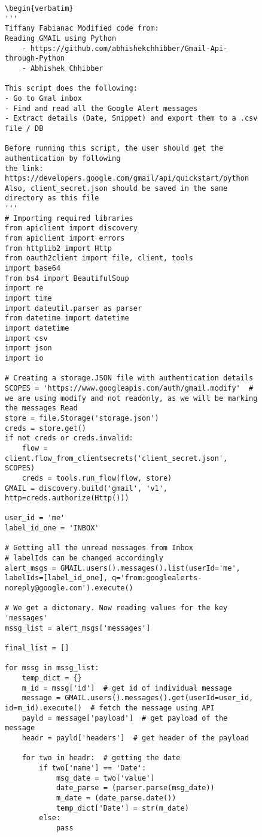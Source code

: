 \documentclass[sigconf]{acmart}
\begin{document}
\begin{figure}[htb]
\begin{lstlisting}
\begin{verbatim}
'''
Tiffany Fabianac Modified code from:
Reading GMAIL using Python
    - https://github.com/abhishekchhibber/Gmail-Api-through-Python
	- Abhishek Chhibber

This script does the following:
- Go to Gmal inbox
- Find and read all the Google Alert messages
- Extract details (Date, Snippet) and export them to a .csv file / DB

Before running this script, the user should get the authentication by following 
the link: https://developers.google.com/gmail/api/quickstart/python
Also, client_secret.json should be saved in the same directory as this file
'''
# Importing required libraries
from apiclient import discovery
from apiclient import errors
from httplib2 import Http
from oauth2client import file, client, tools
import base64
from bs4 import BeautifulSoup
import re
import time
import dateutil.parser as parser
from datetime import datetime
import datetime
import csv
import json
import io

# Creating a storage.JSON file with authentication details
SCOPES = 'https://www.googleapis.com/auth/gmail.modify'  # we are using modify and not readonly, as we will be marking the messages Read
store = file.Storage('storage.json')
creds = store.get()
if not creds or creds.invalid:
    flow = client.flow_from_clientsecrets('client_secret.json', SCOPES)
    creds = tools.run_flow(flow, store)
GMAIL = discovery.build('gmail', 'v1', http=creds.authorize(Http()))

user_id = 'me'
label_id_one = 'INBOX'

# Getting all the unread messages from Inbox
# labelIds can be changed accordingly
alert_msgs = GMAIL.users().messages().list(userId='me', labelIds=[label_id_one], q='from:googlealerts-noreply@google.com').execute()

# We get a dictonary. Now reading values for the key 'messages'
mssg_list = alert_msgs['messages']

final_list = []

for mssg in mssg_list:
    temp_dict = {}
    m_id = mssg['id']  # get id of individual message
    message = GMAIL.users().messages().get(userId=user_id, id=m_id).execute()  # fetch the message using API
    payld = message['payload']  # get payload of the message
    headr = payld['headers']  # get header of the payload

    for two in headr:  # getting the date
        if two['name'] == 'Date':
            msg_date = two['value']
            date_parse = (parser.parse(msg_date))
            m_date = (date_parse.date())
            temp_dict['Date'] = str(m_date)
        else:
            pass


\end{lstlisting}
\end{figure}
\end{document}

